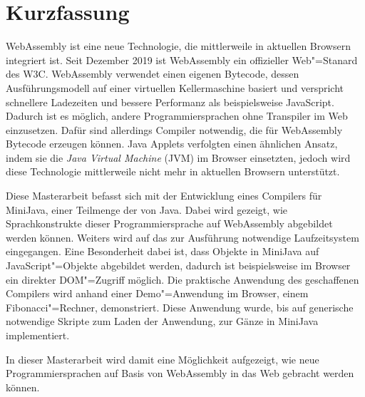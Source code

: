 \chapter{Kurzfassung}

WebAssembly ist eine neue Technologie, die mittlerweile in aktuellen Browsern integriert ist. Seit Dezember 2019 ist WebAssembly ein offizieller Web"=Stanard des W3C. WebAssembly verwendet einen eigenen Bytecode, dessen Ausführungsmodell auf einer virtuellen Kellermaschine basiert und verspricht schnellere Ladezeiten und bessere Performanz als beispielsweise JavaScript. Dadurch ist es möglich, andere Programmiersprachen ohne Transpiler im Web einzusetzen. Dafür sind allerdings Compiler notwendig, die für WebAssembly Bytecode erzeugen können. Java Applets verfolgten einen ähnlichen Ansatz, indem sie die \emph{Java Virtual Machine} (JVM) im Browser einsetzten, jedoch wird diese Technologie mittlerweile nicht mehr in aktuellen Browsern unterstützt.

Diese Masterarbeit befasst sich mit der Entwicklung eines Compilers für MiniJava, einer Teilmenge der von Java. Dabei wird gezeigt, wie Sprachkonstrukte dieser Programmiersprache auf WebAssembly abgebildet werden können. Weiters wird auf das zur Ausführung notwendige Laufzeitsystem eingegangen. Eine Besonderheit dabei ist, dass Objekte in MiniJava auf JavaScript"=Objekte abgebildet werden, dadurch ist beispielsweise im Browser ein direkter DOM"=Zugriff möglich. Die praktische Anwendung des geschaffenen Compilers wird anhand einer Demo"=Anwendung im Browser, einem Fibonacci"=Rechner, demonstriert. Diese Anwendung wurde, bis auf generische notwendige Skripte zum Laden der Anwendung, zur Gänze in MiniJava implementiert.

In dieser Masterarbeit wird damit eine Möglichkeit aufgezeigt, wie neue Programmiersprachen auf Basis von WebAssembly in das Web gebracht werden können.

